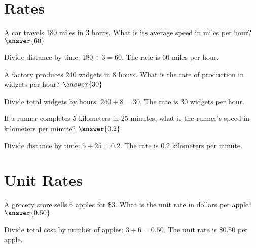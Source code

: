 \documentclass{ximera}
\begin{document}


\section*{Rates}

\begin{problem}
A car travels 180 miles in 3 hours. What is its average speed in miles per hour? $\answer{60}$
\begin{feedback}
Divide distance by time: $180 \div 3 = 60$. The rate is $60$ miles per hour.
\end{feedback}
\end{problem}

\begin{problem}
A factory produces 240 widgets in 8 hours. What is the rate of production in widgets per hour? $\answer{30}$
\begin{feedback}
Divide total widgets by hours: $240 \div 8 = 30$. The rate is $30$ widgets per hour.
\end{feedback}
\end{problem}

\begin{problem}
If a runner completes 5 kilometers in 25 minutes, what is the runner's speed in kilometers per minute? $\answer{0.2}$
\begin{feedback}
Divide distance by time: $5 \div 25 = 0.2$. The rate is $0.2$ kilometers per minute.
\end{feedback}
\end{problem}



\section*{Unit Rates}

\begin{problem}
A grocery store sells 6 apples for \$3. What is the unit rate in dollars per apple? $\answer{0.50}$
\begin{feedback}
Divide total cost by number of apples: $3 \div 6 = 0.50$. The unit rate is \$0.50 per apple.
\end{feedback}
\end{problem}
\end{document}
